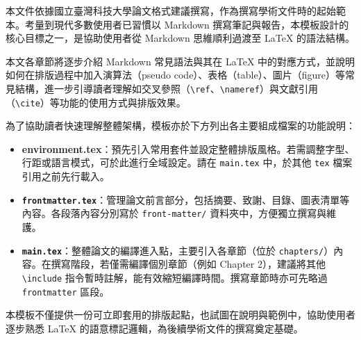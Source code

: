 \newpage
\zhHeader{\zhAbstractTitle}
\normalsize

本文件依據國立臺灣科技大學論文格式建議撰寫，作為撰寫學術文件時的起始範本。考量到現代多數使用者已習慣以 Markdown 撰寫筆記與報告，本模板設計的核心目標之一，是協助使用者從 Markdown 思維順利過渡至 \LaTeX{} 的語法結構。

本文各章節將逐步介紹 Markdown 常見語法與其在 \LaTeX{} 中的對應方式，並說明如何在排版過程中加入演算法（pseudo code）、表格（table）、圖片（figure）等常見結構，進一步引導讀者理解如交叉參照（\verb|\ref|、\verb|\nameref|）與文獻引用（\verb|\cite|）等功能的使用方式與排版效果。

為了協助讀者快速理解整體架構，模板亦於下方列出各主要組成檔案的功能說明：

\begin{itemize}
  \item \textbf{environment.tex}：預先引入常用套件並設定整體排版風格。若需調整字型、行距或語言模式，可於此進行全域設定。請在 \texttt{main.tex} 中，於其他 \texttt{tex} 檔案引用之前先行載入。
  
  \item \textbf{\texttt{frontmatter.tex}}：管理論文前言部分，包括摘要、致謝、目錄、圖表清單等內容。各段落內容分別寫於 \texttt{front-matter/} 資料夾中，方便獨立撰寫與維護。
  
  \item \textbf{\texttt{main.tex}}：整體論文的編譯進入點，主要引入各章節（位於 \texttt{chapters/}）內容。在撰寫階段，若僅需編譯個別章節（例如 Chapter 2），建議將其他 \texttt{\textbackslash include} 指令暫時註解，能有效縮短編譯時間。撰寫章節時亦可先略過 \texttt{frontmatter} 區段。
\end{itemize}

本模板不僅提供一份可立即套用的排版起點，也試圖在說明與範例中，協助使用者逐步熟悉 \LaTeX{} 的語意標記邏輯，為後續學術文件的撰寫奠定基礎。
